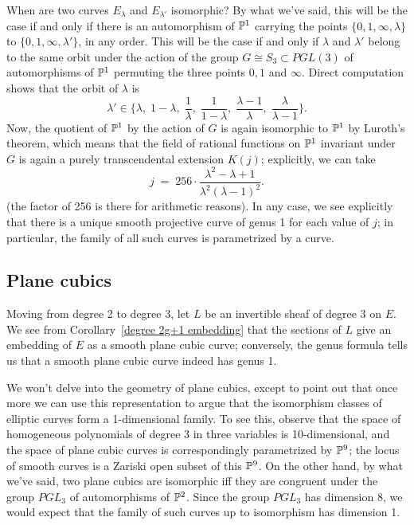 When are two curves $E_\lambda$ and $E_{\lambda'}$ isomorphic? By what we've said, this will be the case if and only if there is an automorphism of ${\mathbb P}^1$ carrying the points $\{0,1,\infty,\lambda\}$ to $\{0,1,\infty,\lambda'\}$, in any order. This will be the case if and only if $\lambda$ and $\lambda'$ belong to the same orbit under the action of the group $G \cong S_3 \subset PGL(3)$ of automorphisms of ${\mathbb P}^1$ permuting the three points $0, 1$ and $\infty$. Direct computation shows that the orbit of $\lambda$ is
$$
\lambda' \in \{\lambda, \; 1-\lambda, \; \frac{1}{\lambda},\;  \frac{1}{1-\lambda}, \; \frac{\lambda - 1}{\lambda}, \; \frac{\lambda}{\lambda - 1} \}.
$$
Now, the quotient of ${\mathbb P}^1$ by the action of $G$ is again isomorphic to ${\mathbb P}^1$ by Luroth's theorem, which means that the field of rational functions on ${\mathbb P}^1$ invariant under $G$ is again a purely transcendental extension $K(j)$; explicitly, we can take
$$
j \; = \; 256\cdot \frac{\lambda^2 - \lambda + 1}{\lambda^2(\lambda - 1)^2}.
$$
(the factor of 256 is there for arithmetic reasons). In any case, we see explicitly that there is a unique smooth projective curve of genus 1 for each value of $j$; in particular, the family of all such curves is parametrized by a curve.

\subsection{Plane cubics}

Moving from degree 2 to degree 3, let $L$ be an invertible sheaf of degree 3 on $E$. We see from Corollary~\ref{degree 2g+1 embedding} that the sections of $L$ give an embedding of $E$ as a smooth plane cubic curve; conversely, the genus formula tells us that a smooth plane cubic curve indeed has genus 1. 

We won't delve into the geometry of plane cubics, except to point out that once more we can use this representation to argue that the isomorphism classes of elliptic curves form a 1-dimensional family. To see this, observe that the space of homogeneous polynomials of degree 3 in three variables is 10-dimensional, and the space of plane cubic curves is correspondingly parametrized by  ${\mathbb P}^9$; the locus of smooth curves is a Zariski open subset of this ${\mathbb P}^9$. On the other hand, by what we've said, two plane cubics are isomorphic iff they are congruent under the group $PGL_3$ of automorphisms of ${\mathbb P}^2$. Since the group $PGL_3$ has dimension 8, we would expect that the family of such curves up to isomorphism has dimension 1.

